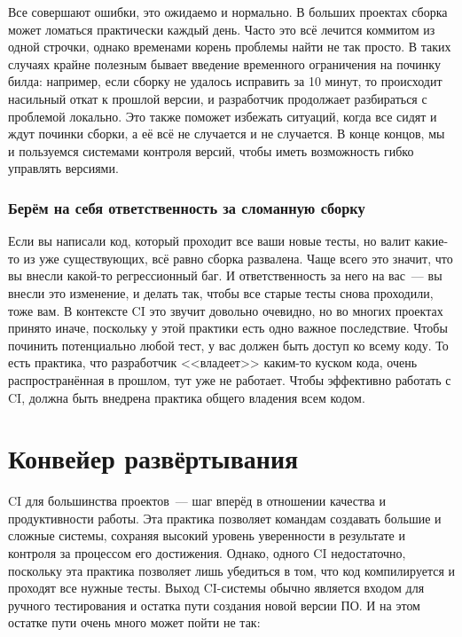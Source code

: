 \documentclass{../../text-style}
\begin{document}
Все совершают ошибки, это ожидаемо и нормально. В больших проектах сборка может ломаться практически каждый день. Часто это всё лечится коммитом из одной строчки, однако временами корень проблемы найти не так просто. В таких случаях крайне полезным бывает введение временного ограничения на починку билда: например, если сборку не удалось исправить за 10 минут, то происходит насильный откат к прошлой версии, и разработчик продолжает разбираться с проблемой локально. Это также поможет избежать ситуаций, когда все сидят и ждут починки сборки, а её всё не случается и не случается. В конце концов, мы и пользуемся системами контроля версий, чтобы иметь возможность гибко управлять версиями.

\subsubsection{Берём на себя ответственность за сломанную сборку}

Если вы написали код, который проходит все ваши новые тесты, но валит какие-то из уже существующих, всё равно сборка развалена. Чаще всего это значит, что вы внесли какой-то регрессионный баг. И ответственность за него на вас~--- вы внесли это изменение, и делать так, чтобы все старые тесты снова проходили, тоже вам. В контексте CI это звучит довольно очевидно, но во многих проектах принято иначе, поскольку у этой практики есть одно важное последствие. Чтобы починить потенциально любой тест, у вас должен быть доступ ко всему коду. То есть практика, что разработчик <<владеет>> каким-то куском кода, очень распространённая в прошлом, тут уже не работает. Чтобы эффективно работать с CI, должна быть внедрена практика общего владения всем кодом.

\section{Конвейер развёртывания}

CI для большинства проектов~--- шаг вперёд в отношении качества и продуктивности работы. Эта практика позволяет командам создавать большие и сложные системы, сохраняя высокий уровень уверенности в результате и контроля за процессом его достижения. Однако, одного CI недостаточно, поскольку эта практика позволяет лишь убедиться в том, что код компилируется и проходят все нужные тесты. Выход CI-системы обычно является входом для ручного тестирования и остатка пути создания новой версии ПО. И на этом остатке пути очень много может пойти не так:
\end{document}
